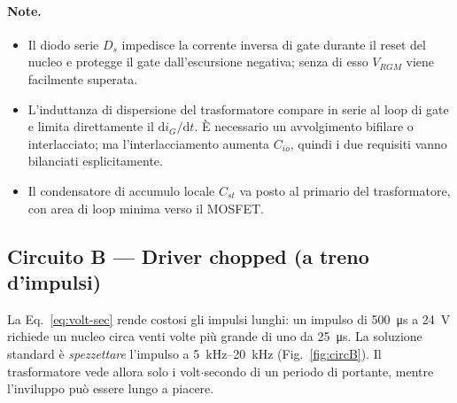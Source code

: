 \documentclass[11pt,a4paper]{article}
\begin{document}
\paragraph{Note.}
\begin{itemize}
  \item Il diodo serie $D_s$ impedisce la corrente inversa di gate durante il reset
        del nucleo e protegge il gate dall'escursione negativa; senza di esso
        $V_{RGM}$ viene facilmente superata.
  \item L'induttanza di dispersione del trasformatore compare in serie al loop di
        gate e limita direttamente il $\mathrm{d}i_G/\mathrm{d}t$. È necessario un
        avvolgimento bifilare o interlacciato; ma l'interlacciamento aumenta
        $C_{io}$, quindi i due requisiti vanno bilanciati esplicitamente.
  \item Il condensatore di accumulo locale $C_{st}$ va posto al primario del
        trasformatore, con area di loop minima verso il MOSFET.
\end{itemize}

\subsection{Circuito B --- Driver chopped (a treno d'impulsi)}

La Eq.~\eqref{eq:volt-sec} rende costosi gli impulsi lunghi: un impulso di
\SI{500}{\micro\second} a \SI{24}{\volt} richiede un nucleo circa venti volte più
grande di uno da \SI{25}{\micro\second}. La soluzione standard è \emph{spezzettare}
l'impulso a \SIrange{5}{20}{\kilo\hertz} (Fig.~\ref{fig:circB}). Il trasformatore
vede allora solo i volt$\cdot$secondo di un periodo di portante, mentre l'inviluppo
può essere lungo a piacere.
\end{document}
